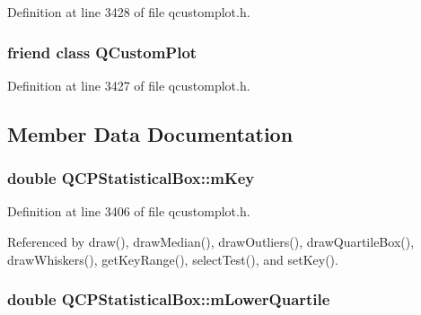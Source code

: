 Definition at line 3428 of file qcustomplot.\+h.

\hypertarget{class_q_c_p_statistical_box_a1cdf9df76adcfae45261690aa0ca2198}{}
\subsubsection[{Q\+Custom\+Plot}]{\setlength{\rightskip}{0pt plus 5cm}friend class {\bf Q\+Custom\+Plot}\hspace{0.3cm}{\ttfamily [friend]}}\label{class_q_c_p_statistical_box_a1cdf9df76adcfae45261690aa0ca2198}


Definition at line 3427 of file qcustomplot.\+h.



\subsection{Member Data Documentation}
\hypertarget{class_q_c_p_statistical_box_a86fd1d3be5c5bc11d11eda7517069af4}{}
\subsubsection[{m\+Key}]{\setlength{\rightskip}{0pt plus 5cm}double Q\+C\+P\+Statistical\+Box\+::m\+Key\hspace{0.3cm}{\ttfamily [protected]}}\label{class_q_c_p_statistical_box_a86fd1d3be5c5bc11d11eda7517069af4}


Definition at line 3406 of file qcustomplot.\+h.



Referenced by draw(), draw\+Median(), draw\+Outliers(), draw\+Quartile\+Box(), draw\+Whiskers(), get\+Key\+Range(), select\+Test(), and set\+Key().

\hypertarget{class_q_c_p_statistical_box_acac86cac93d9fa3d820b5aaa04ed96f6}{}
\subsubsection[{m\+Lower\+Quartile}]{\setlength{\rightskip}{0pt plus 5cm}double Q\+C\+P\+Statistical\+Box\+::m\+Lower\+Quartile\hspace{0.3cm}{\ttfamily [protected]}}\label{class_q_c_p_statistical_box_acac86cac93d9fa3d820b5aaa04ed96f6}


